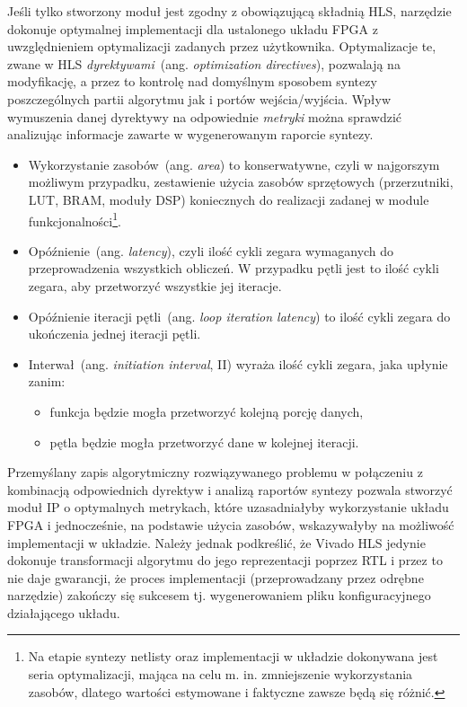 Jeśli tylko stworzony moduł jest zgodny z obowiązującą składnią HLS, narzędzie dokonuje optymalnej implementacji dla ustalonego układu FPGA z uwzględnieniem optymalizacji zadanych przez użytkownika. Optymalizacje te, zwane w HLS \textit{dyrektywami}~(ang. \textit{optimization directives}), pozwalają na modyfikację, a przez to kontrolę nad domyślnym sposobem syntezy poszczególnych partii algorytmu jak i portów wejścia/wyjścia. Wpływ wymuszenia danej dyrektywy na odpowiednie \textit{metryki} można sprawdzić analizując informacje zawarte w wygenerowanym raporcie syntezy.
\begin{itemize}
\item Wykorzystanie zasobów~(ang. \textit{area}) to konserwatywne, czyli w najgorszym możliwym przypadku, zestawienie użycia zasobów sprzętowych (przerzutniki, LUT, BRAM, moduły DSP) koniecznych do realizacji zadanej w module funkcjonalności\footnote{Na etapie syntezy netlisty oraz implementacji w układzie dokonywana jest seria optymalizacji, mająca na celu m. in. zmniejszenie wykorzystania zasobów, dlatego wartości estymowane i faktyczne zawsze będą się różnić.}. 
\item Opóźnienie~(ang. \textit{latency}), czyli ilość cykli zegara wymaganych do przeprowadzenia wszystkich obliczeń. W przypadku pętli jest to ilość cykli zegara, aby przetworzyć wszystkie jej iteracje.
\item Opóźnienie iteracji pętli~(ang. \textit{loop iteration latency}) to ilość cykli zegara do ukończenia jednej iteracji pętli.
\item Interwał~(ang. \textit{initiation interval}, II) wyraża ilość cykli zegara, jaka upłynie zanim:
\begin{itemize}
\item funkcja będzie mogła przetworzyć kolejną porcję danych,
\item pętla będzie mogła przetworzyć dane w kolejnej iteracji.
\end{itemize} 
\end{itemize}
Przemyślany zapis algorytmiczny rozwiązywanego problemu w połączeniu z kombinacją odpowiednich dyrektyw i analizą raportów syntezy pozwala stworzyć moduł IP o optymalnych metrykach, które uzasadniałyby wykorzystanie układu FPGA i jednocześnie, na podstawie użycia zasobów, wskazywałyby na możliwość implementacji w układzie. Należy jednak podkreślić, że Vivado HLS jedynie dokonuje transformacji algorytmu do jego reprezentacji poprzez RTL i przez to nie daje gwarancji, że proces implementacji (przeprowadzany przez odrębne narzędzie) zakończy się sukcesem tj. wygenerowaniem pliku konfiguracyjnego działającego układu.

